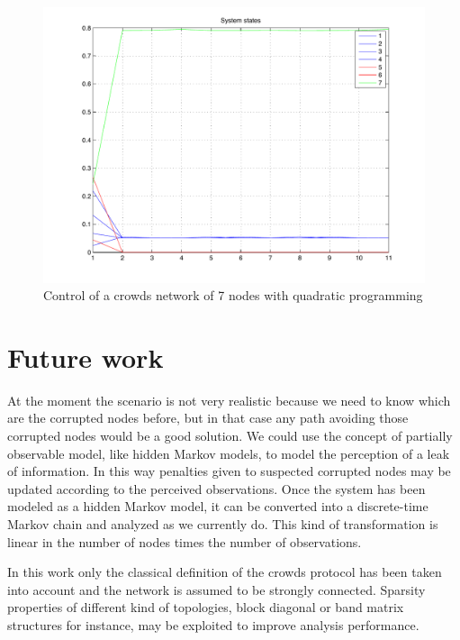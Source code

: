 \documentclass[a4paper, 11pt]{article}
\theoremstyle{definition}
\theoremstyle{remark}
\begin{document}
\begin{figure}[htbp]
	\begin{center}
	\includegraphics[width=.8\textwidth]{images/qp}
	\end{center}
	\caption{Control of a crowds network of 7 nodes with quadratic programming}
	\label{fig:results2}
\end{figure}

\section{Future work} %
\label{sec:future_work}

At the moment the scenario is not very realistic because we need to know which are the corrupted nodes before, but in that case any path avoiding those corrupted nodes would be a good solution. We could use the concept of partially observable model, like hidden Markov models, to model the perception of a leak of information. In this way penalties given to suspected corrupted nodes may be updated according to the perceived observations. Once the system has been modeled as a hidden Markov model, it can be converted into a discrete-time Markov chain and analyzed as we currently do. This kind of transformation is linear in the number of nodes times the number of observations.

In this work only the classical definition of the crowds protocol has been taken into account and the network is assumed to be strongly connected. Sparsity properties of different kind of topologies, block diagonal or band matrix structures for instance, may be exploited to improve analysis performance.



\end{document}
